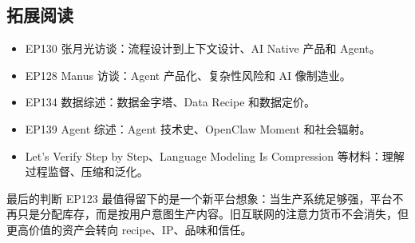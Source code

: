 \documentclass[a4paper]{article}
\begin{document}
\subsection{拓展阅读}

\begin{itemize}
\item EP130 张月光访谈：流程设计到上下文设计、AI Native 产品和 Agent。
\item EP128 Manus 访谈：Agent 产品化、复杂性风险和 AI 像制造业。
\item EP134 数据综述：数据金字塔、Data Recipe 和数据定价。
\item EP139 Agent 综述：Agent 技术史、OpenClaw Moment 和社会辐射。
\item Let's Verify Step by Step、Language Modeling Is Compression 等材料：理解过程监督、压缩和泛化。
\end{itemize}

\begin{importantbox}{最后的判断}
EP123 最值得留下的是一个新平台想象：当生产系统足够强，平台不再只是分配库存，而是按用户意图生产内容。旧互联网的注意力货币不会消失，但更高价值的资产会转向 recipe、IP、品味和信任。
\end{importantbox}
\end{document}
